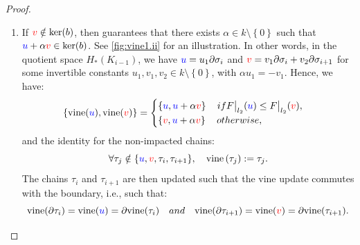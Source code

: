 \documentclass{article}
\newcommand{\vine}{\mathrm{vine}}
\newcommand\restr[2]{{  \left.\kern-\nulldelimiterspace #1 \vphantom{\big|} \right|_{#2}  }}
\begin{document}
\begin{proof}
\begin{enumerate}
\begin{enumerate}
					\begin{equation}
						\forall 1\le j \le N, \quad \tau_j \mapsto \vine \left( \tau_j \right) := \tau_j
					\end{equation}
					is a reduced basis of the filtered chain complex
					$(\hat K_j)_{1\le j\le N}$
					and hence of the filtered chain complex
					$\restr F {l_2}$.
					Hence, \cref{eq:vineyards_line_proj} guarantees that for any
					index $j$, the matched bar endpoints, $\tau_j \mapsto \vine(\tau_j)$, with filtration values $x_{j}^{l_1}$ and
					$x_j^{l_2}$ are not strictly comparable, and thus the induced matching function is compatible.
				\item{}{} \label{vine:case1ii} If ${\color{red} v}\notin \ker(b)$, then
					\cite[Theorem 2.4]{mariaZigzagPersistenceReflections2015}
					guarantees that there exists $\alpha\in k\setminus \left\{ 0
					\right\} $ such that
					${\color{blue} u}+\alpha {\ensuremath{\color{red} v}} \in \ker(b)$.
					See \cref{fig:vine1.ii} for an illustration.
					In other words, in the quotient space ${H_*(K_{i-1})}$, we
					have  ${\color{blue} u} = u_1 \partial \sigma_i$
					and ${\color{red} v} = v_1\partial \sigma_{i} + v_2 \partial \sigma_{i+1}$ for some invertible
					constants $u_1, v_1, v_2 \in k\setminus \left\{ 0 \right\} $, with $ \alpha u_1 = -
					v_1$.
					Hence, we have:
					\begin{equation}\label{vine:case1ii_eq}
						\left\{  \vine(\u), \vine(\v) \right\} =
						\begin{cases}
							\left\{ \u, \u + \alpha \v \right\} \quad \textnormal{if } \restr
							F {l_2}(\u) \le \restr F {l_2}(\v), \\
							\left\{ \v, \u +\alpha\v\right\}\quad \textnormal{otherwise,}
						\end{cases}
					\end{equation}
					and the identity for the non-impacted chains:
					\begin{equation}
						\forall \tau_j \notin{ \left\{ \u,\v, \tau_i,
						\tau_{i+1}\right\} },
						\quad
						\vine \left( \tau_j \right) : =
						\tau_j.
					\end{equation}
					The chains $\tau_i$ and $\tau_{i+1}$ are then updated such that
					the vine update commutes with the boundary, i.e., such
					that:
					\begin{equation}\label{eq:vine_coboundary_update}
						\vine (\partial \tau_i) = \vine(\u) = \partial
						\vine(\tau_i)
						\quad \textnormal{and} \quad
						\vine (\partial \tau_{i+1}) = \vine(\v) = \partial
						\vine(\tau_{i+1}).
					\end{equation}

\end{enumerate}
\end{enumerate}
\end{proof}
\end{document}
